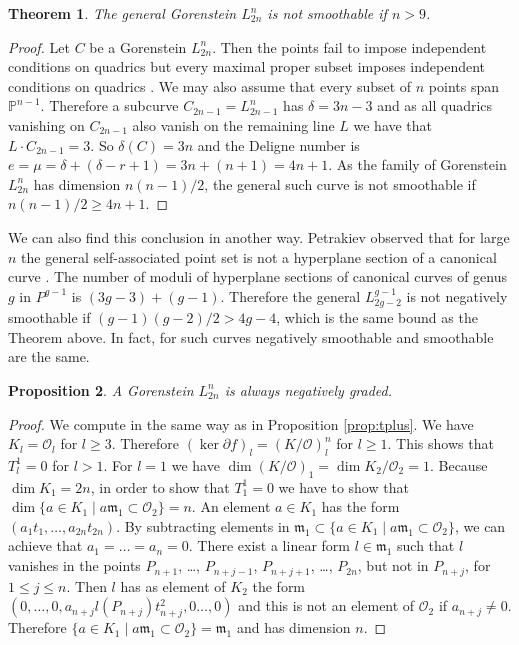 \documentclass{amsart}
\renewcommand{\P}{\mathbb{P}}
\newcommand {\m}{\mathfrak{m}}
\renewcommand{\ell}{l}
\newcommand{\mO}{\mathcal{O}}
\newtheorem{thm}{Theorem}[section]
\newtheorem{prop}[thm]{Proposition}
\theoremstyle{definition}
\theoremstyle{remark}
\begin{document}
\begin{thm}\label{thm:saccnotsm}
The general Gorenstein $L_{2n}^n$ is not smoothable if $n>9$.
\end{thm}


\begin{proof}
Let $C$ be a Gorenstein $L_{2n}^n$.  Then the points fail
 to impose independent conditions on quadrics but every
maximal proper subset imposes independent conditions on quadrics \cite[Sect. 7]{EP}. We
may also assume that every subset of $n$ points span $\P^{n-1}$.
Therefore a  subcurve $C_{2n-1}=L_{2n-1}^n$ has $\delta=3n-3$ and as all quadrics vanishing on
$C_{2n-1}$ also vanish on the remaining line $L$ we have that $L\cdot C_{2n-1}=3$.
So $\delta(C)=3n$ and the Deligne number is $e=\mu = 
\delta+(\delta-r+1)=3n+(n+1)=4n+1$.
As  the family of Gorenstein  $L_{2n}^n$ has dimension $n(n-1)/2$, the general such curve
is not smoothable if $n(n-1)/2\geq 4n+1$.
\end{proof}

We can also find this conclusion in another way. 
Petrakiev observed that for large $n$ the general self-associated point set is not  a hyperplane section
of a canonical curve \cite[Sect. 4]{Pe}.
The number of moduli of  hyperplane sections of  canonical curves
of genus $g$ in $P^{g-1}$
 is $(3g-3) + (g-1)$. Therefore the general $L_{2g-2}^{g-1}$ is not negatively
smoothable if $(g-1)(g-2)/2>4g-4$, which is the same bound as the Theorem above. 
In fact, for such curves negatively smoothable and smoothable are the same.


\begin{prop}
A Gorenstein $L_{2n}^n$ is always negatively graded.
\end{prop}

 \begin{proof}
 We compute in the same way as in Proposition \ref{prop:tplus}.
 We have $K_{\ell}=\mO_{\ell}$ for $\ell\geq 3$. Therefore $(\ker %
 {\partial f})_{\ell}=
 (K/\mO)^n_{\ell}$ for $\ell\geq 1$.  This shows that $T^1_{\ell}=0$ for $\ell>1$. For 
 $\ell=1$ we have $\dim (K/\mO)_1=\dim K_2/\mO_2=1$.
  Because $\dim K_1 = 2n$, in order to show that $T^1_1=0$ 
 we have to show that  $\dim \{ a\in K_1\mid a\m_1\subset \mO_2\}=n$.  
 An element $a\in K_1$
 has the form $(a_1t_1,\dots,a_{2n}t_{2n})$. By subtracting elements in $\m_1\subset
 \{ a\in K_1\mid a\m_1\subset \mO_2\}$,
  we can achieve
 that $a_1=\dots=a_n=0$. There exist a linear form $l\in\m_1$ such that $l$ vanishes
 in the points $P_{n+1}$, \dots, $P_{n+j-1}$, $P_{n+j+1}$, \dots, $P_{2n}$, but not in $P_{n+j}$,
 for $1\leq j \leq n$. Then $l$
 has as element of $K_2$ the form $(0,\dots,0,a_{n+j}l(P_{n+j})t_{n+j}^2,0\dots,0)$ and
 this is not an element of $\mO_2$ if $a_{n+j}\neq0$. Therefore 
$ \{ a\in K_1\mid a\m_1\subset \mO_2\}=\m_1$ and has dimension $n$.
 \end{proof}
 
\end{document}

